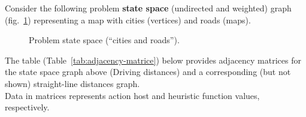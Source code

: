 \documentclass[assignment={1},
duedate={Saturday, February 10, 2024, 11:59 PM CST},
points={30}]{cs581homework}
\renewcommand{\nodeset}[1][.]{
	\ifinanswer%
	\colorlet{current}{blue}%
	\else%
	\colorlet{current}{#1}%
	\fi%
	\tikzset{every node/.style={current,rectangle,rounded corners,draw,thick,minimum width=1.2cm,minimum height=0.75cm}}
}
\renewcommand{\pathset}[1][.]{
	\ifinanswer%
	\colorlet{current}{blue}%
	\else%
	\colorlet{current}{#1}%
	\fi%
	\tikzset{>={Stealth[current]},
		every node/.style={current,fill=white,circle},
		every edge/.style={current,draw,very thick}}%
}
\begin{document}
Consider the following problem \textbf{state space} (undirected and weighted) graph (fig.~\ref{fig:cities-and-roads}) representing a map with cities (vertices) and roads (maps).
\begin{figure}[H]
	\centering
	\caption{Problem state space (``cities and roads'').}
	\label{fig:cities-and-roads}
\end{figure}
The table (Table~\ref{tab:adjacency-matrice}) below provides adjacency matrices for the state space graph above (Driving distances) and a corresponding (but not shown) straight-line distances graph.\\

Data in matrices represents action host and heuristic function values, respectively.
\end{document}
